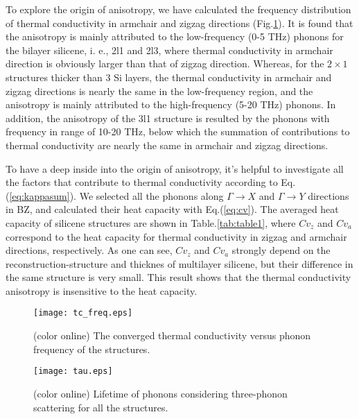 \documentclass[aps,prb,twocolumn,showpacs,amsmath,amssymb]{revtex4-1}
\begin{document}
To explore the origin of anisotropy, we have calculated the frequency distribution of thermal conductivity in armchair and zigzag directions  (Fig.\ref{fig:tc_freq}).
It is found that the  anisotropy is mainly attributed to the low-frequency (0-5 THz) phonons for the bilayer silicene, i. e., 2l1 and 2l3, where thermal conductivity in armchair direction is obviously larger than that of zigzag direction.
Whereas, for the $2\times1$ structures thicker than 3 Si layers, the thermal conductivity in armchair and zigzag directions is nearly the same in the low-frequency region, and the anisotropy is mainly  attributed to the high-frequency (5-20 THz) phonons.
In addition, the anisotropy of the 3l1 structure is resulted by the  phonons with frequency in range of 10-20 THz, below which the summation of contributions to thermal conductivity are nearly the same in armchair and zigzag directions.

To have a deep inside into the origin of anisotropy, it's helpful to investigate all the factors that contribute to thermal conductivity according to Eq.(\ref{eq:kappasum}).
We selected all the phonons along  $\Gamma\rightarrow X$ and $\Gamma \rightarrow Y$ directions in BZ, and calculated their heat capacity with Eq.(\ref{eq:cv}). The averaged heat capacity of silicene structures are shown in Table.\ref{tab:table1}, where $Cv_z$ and $Cv_a$ correspond to the  heat capacity for thermal conductivity in  zigzag and armchair directions, respectively.  As one can see, $Cv_z$ and $Cv_a$  strongly depend on the reconstruction-structure and thicknes of multilayer silicene, but their difference in the same structure is very small. This result shows that the thermal conductivity anisotropy is insensitive to the heat capacity.

\begin{figure}[b]
  \texttt{[image: tc\_freq.eps]}
  \caption{\label{fig:tc_freq} (color online)  The converged thermal conductivity versus phonon frequency of the structures. }
\end{figure}

\begin{figure}[b]
  \texttt{[image: tau.eps]}
  \caption{\label{fig:tau} (color online) Lifetime of phonons considering three-phonon scattering for all the structures. }
\end{figure}
\end{document}

